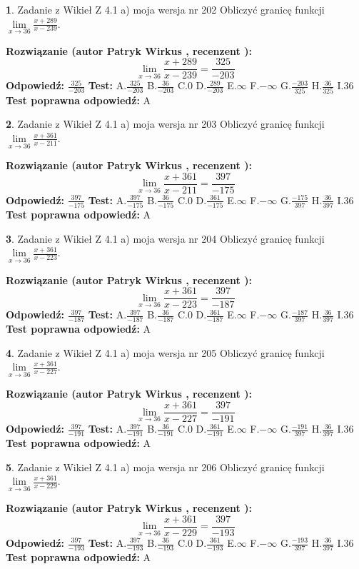 \documentclass[12pt, a4paper]{article}
\theoremstyle{definition} %
\newtheorem{zad}{}
\newcommand{\zadStart}[1]{\begin{zad}#1\newline}
\newcommand{\zadStop}{\end{zad}}
\newcommand{\rozwStart}[2]{\noindent \textbf{Rozwiązanie (autor #1 , recenzent #2): }\newline}
\newcommand{\rozwStop}{\newline}
\newcommand{\odpStart}{\noindent \textbf{Odpowiedź:}\newline}
\newcommand{\odpStop}{\newline}
\newcommand{\testStart}{\noindent \textbf{Test:}\newline}
\newcommand{\testStop}{\newline}
\newcommand{\kluczStart}{\noindent \textbf{Test poprawna odpowiedź:}\newline}
\newcommand{\kluczStop}{\newline}
\begin{document}
\zadStart{Zadanie z Wikieł Z 4.1 a) moja wersja nr 202}
Obliczyć granicę funkcji $\lim\limits_{x\to36}\frac{x+289}{x-239}$.
\zadStop
\rozwStart{Patryk Wirkus}{}
$$\lim\limits_{x\to36}\frac{x+289}{x-239} = \frac{325}{-203}$$
\rozwStop
\odpStart
$\frac{325}{-203}$
\odpStop
\testStart
A.$\frac{325}{-203}$
B.$\frac{36}{-203}$
C.$0$
D.$\frac{289}{-203}$
E.$\infty$
F.$-\infty$
G.$\frac{-203}{325}$
H.$\frac{36}{325}$
I.$36$
\testStop
\kluczStart
A
\kluczStop



\zadStart{Zadanie z Wikieł Z 4.1 a) moja wersja nr 203}
Obliczyć granicę funkcji $\lim\limits_{x\to36}\frac{x+361}{x-211}$.
\zadStop
\rozwStart{Patryk Wirkus}{}
$$\lim\limits_{x\to36}\frac{x+361}{x-211} = \frac{397}{-175}$$
\rozwStop
\odpStart
$\frac{397}{-175}$
\odpStop
\testStart
A.$\frac{397}{-175}$
B.$\frac{36}{-175}$
C.$0$
D.$\frac{361}{-175}$
E.$\infty$
F.$-\infty$
G.$\frac{-175}{397}$
H.$\frac{36}{397}$
I.$36$
\testStop
\kluczStart
A
\kluczStop



\zadStart{Zadanie z Wikieł Z 4.1 a) moja wersja nr 204}
Obliczyć granicę funkcji $\lim\limits_{x\to36}\frac{x+361}{x-223}$.
\zadStop
\rozwStart{Patryk Wirkus}{}
$$\lim\limits_{x\to36}\frac{x+361}{x-223} = \frac{397}{-187}$$
\rozwStop
\odpStart
$\frac{397}{-187}$
\odpStop
\testStart
A.$\frac{397}{-187}$
B.$\frac{36}{-187}$
C.$0$
D.$\frac{361}{-187}$
E.$\infty$
F.$-\infty$
G.$\frac{-187}{397}$
H.$\frac{36}{397}$
I.$36$
\testStop
\kluczStart
A
\kluczStop



\zadStart{Zadanie z Wikieł Z 4.1 a) moja wersja nr 205}
Obliczyć granicę funkcji $\lim\limits_{x\to36}\frac{x+361}{x-227}$.
\zadStop
\rozwStart{Patryk Wirkus}{}
$$\lim\limits_{x\to36}\frac{x+361}{x-227} = \frac{397}{-191}$$
\rozwStop
\odpStart
$\frac{397}{-191}$
\odpStop
\testStart
A.$\frac{397}{-191}$
B.$\frac{36}{-191}$
C.$0$
D.$\frac{361}{-191}$
E.$\infty$
F.$-\infty$
G.$\frac{-191}{397}$
H.$\frac{36}{397}$
I.$36$
\testStop
\kluczStart
A
\kluczStop



\zadStart{Zadanie z Wikieł Z 4.1 a) moja wersja nr 206}
Obliczyć granicę funkcji $\lim\limits_{x\to36}\frac{x+361}{x-229}$.
\zadStop
\rozwStart{Patryk Wirkus}{}
$$\lim\limits_{x\to36}\frac{x+361}{x-229} = \frac{397}{-193}$$
\rozwStop
\odpStart
$\frac{397}{-193}$
\odpStop
\testStart
A.$\frac{397}{-193}$
B.$\frac{36}{-193}$
C.$0$
D.$\frac{361}{-193}$
E.$\infty$
F.$-\infty$
G.$\frac{-193}{397}$
H.$\frac{36}{397}$
I.$36$
\testStop
\kluczStart
A
\kluczStop
\end{document}

